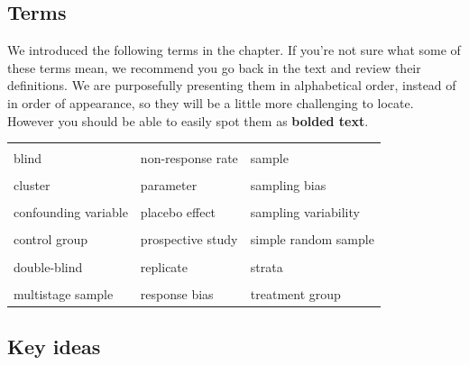 \documentclass[
  10pt,
  openany]{book}
\theoremstyle{definition}
\theoremstyle{definition}
\theoremstyle{definition}
\theoremstyle{definition}
\theoremstyle{remark}
\begin{document}
\subsection*{Terms}\label{terms-1}

We introduced the following terms in the chapter.
If you're not sure what some of these terms mean, we recommend you go back in the text and review their definitions.
We are purposefully presenting them in alphabetical order, instead of in order of appearance, so they will be a little more challenging to locate.
However you should be able to easily spot them as \textbf{bolded text}.

\begin{tabu} to 
\toprule
{} &  & \\
blind & non-response rate & sample\\
 &  & \\
cluster & parameter & sampling bias\\
 &  & \\
confounding variable & placebo effect & sampling variability\\
 &  & \\
control group & prospective study & simple random sample\\
 &  & \\
double-blind & replicate & strata\\
 &  & \\
multistage sample & response bias & treatment group\\
\bottomrule
\end{tabu}

\subsection*{Key ideas}\label{key-ideas-1}
\end{document}
